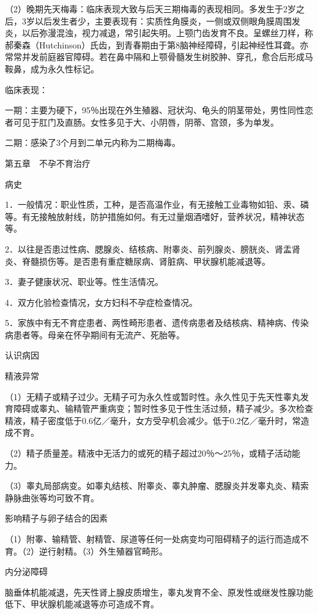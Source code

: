 \documentclass[12pt,UTF8]{ctexbook}
\begin{document}
（2）晚期先天梅毒：临床表现大致与后天三期梅毒的表现相同。多发生于2岁之后，3岁以后发生者少，主要表现有：实质性角膜炎，一侧或双侧眼角膜周围发炎，以后弥漫混浊，视力减退，常引起失明。上颚门齿发育不良。呈螺丝刀样，称郝秦森（Hutchinson）氏齿，到青春期由于第8脑神经障碍，引起神经性耳聋。亦常常并发前庭器官障碍。若在鼻中隔和上颚骨髓发生树胶肿、穿孔，愈合后形成马鞍鼻，成为永久性标记。

临床表现：

一期：主要为硬下，95％出现在外生殖器、冠状沟、龟头的阴茎带处，男性同性恋者可见于肛门及直肠。女性多见于大、小阴唇，阴蒂、宫颈，多为单发。

二期：感染了3个月到二单元内称为二期梅毒。





第五章　不孕不育治疗


病史


1．一般情况：职业性质，工种，是否高温作业，有无接触工业毒物如铅、汞、磷等。有无接触放射线，防护措施如何。有无过量烟酒嗜好，营养状况，精神状态等。

2．以往是否患过性病、腮腺炎、结核病、附睾炎、前列腺炎、膀胱炎、肾盂肾炎、脊髓损伤等。是否患有重症糖尿病、肾脏病、甲状腺机能减退等。

3．妻子健康状况、职业等。性生活情况。

4．双方化验检查情况，女方妇科不孕症检查情况。

5．家族中有无不育症患者、两性畸形患者、遗传病患者及结核病、精神病、传染病患者等。母亲在怀孕期间有无流产、死胎等。





认识病因


精液异常

（1）无精子或精子过少。无精子可为永久性或暂时性。永久性见于先天性睾丸发育障碍或睾丸、输精管严重病变；暂时性多见于性生活过频，精子减少。多次检查精液，精子密度低于0.6亿／毫升，女方受孕机会减少。低于0.2亿／毫升时，常造成不育。

（2）精子质量差。精液中无活力的或死的精子超过20％～25％，或精子活动能力。

（3）睾丸局部病变。如睾丸结核、附睾炎、睾丸肿瘤、腮腺炎并发睾丸炎、精索静脉曲张等均可致不育。

影响精子与卵子结合的因素

（1）附睾、输精管、射精管、尿道等任何一处病变均可阻碍精子的运行而造成不育。（2）逆行射精。（3）外生殖器官畸形。

内分泌障碍

脑垂体机能减退，先天性肾上腺皮质增生，睾丸发育不全、原发性或继发性腺功能低下、甲状腺机能减退等亦可造成不育。
\end{document}

